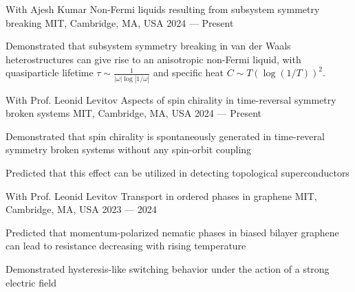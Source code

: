 

\begin{cventries}

\cventry
{With Ajesh Kumar} %
{Non-Fermi liquids resulting from subsystem symmetry breaking} %
{MIT, Cambridge, MA, USA} %
{2024 --- Present} %
{
	\begin{cvitems} %
		\item{Demonstrated that subsystem symmetry breaking in van der Waals heterostructures can give rise to an anisotropic non-Fermi liquid, with quasiparticle lifetime $\tau \sim \frac{1}{|\omega|\log|1/\omega|}$ and specific heat $C \sim T (\log(1/T))^2$.}
	\end{cvitems}
}

\cventry
{With Prof. Leonid Levitov} %
{Aspects of spin chirality in time-reversal symmetry broken systems} %
{MIT, Cambridge, MA, USA} %
{2024 --- Present} %
{
	\begin{cvitems} %
		\item{Demonstrated that spin chirality is spontaneously generated in time-reveral symmetry broken systems without any spin-orbit coupling}
		\item{Predicted that this effect can be utilized in detecting topological superconductors}
	\end{cvitems}
}

\cventry
{With Prof. Leonid Levitov} %
{Transport in ordered phases in graphene} %
{MIT, Cambridge, MA, USA} %
{2023 --- 2024} %
{
	\begin{cvitems} %
		\item{Predicted that momentum-polarized nematic phases in biased bilayer graphene can lead to resistance decreasing with rising temperature}
		\item{Demonstrated hysteresis-like switching behavior under the action of a strong electric field}
	\end{cvitems}
}


\end{cventries}
